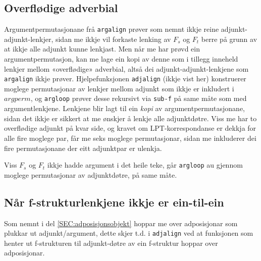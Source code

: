 \documentclass[12pt,a4paper,oneside,draft]{report}
\begin{document}
\subsection{Overflødige adverbial}
\label{sec-4.1.1}

   \label{SEC:impl-adjalign}

Argumentpermutasjonane frå \texttt{argalign} prøver som nemnt ikkje reine
adjunkt-adjunkt-lenkjer, sidan me ikkje vil forkaste lenking av $F_s$
og $F_t$ berre på grunn av at ikkje alle adjunkt kunne lenkjast. Men
når me har prøvd ein argumentpermutasjon, kan me lage ein kopi av
denne som i tillegg inneheld lenkjer mellom «overflødige» adverbial,
altså dei adjunkt-adjunkt-lenkjene som \texttt{argalign} ikkje
prøver. Hjelpefunksjonen \texttt{adjalign} (ikkje vist her) konstruerer
moglege permutasjonar av lenkjer mellom adjunkt som ikkje er inkludert
i $argperm$, og \texttt{argloop} prøver desse rekursivt via \texttt{sub-f} på same
måte som med argumentlenkjene. Lenkjene blir lagt til ein \emph{kopi} av
argumentpermutasjonane, sidan det ikkje er sikkert at me ønskjer å
lenkje alle adjunktdøtre. Viss me har to overflødige adjunkt på kvar
side, og kravet om LPT\hyp{}korrespondanse er dekkja for alle fire moglege
par, får me seks moglege permutasjonar, sidan me inkluderer dei fire
permutasjonane der eitt adjunktpar er ulenkja.

Viss $F_s$ og $F_t$ ikkje hadde argument i det heile teke, går
\texttt{argloop} au gjennom moglege permutasjonar av adjunktdøtre, på same
måte.
\subsection{Når f\hyp{}strukturlenkjene ikkje er ein-til-ein}
\label{sec-4.1.2}

Som nemnt i del \ref{SEC:adposisjonsobjekt} hoppar me over
 adposisjonar som plukkar ut adjunkt/argument, dette skjer t.d. i
 \texttt{adjalign} ved at funksjonen som henter ut f\hyp{}strukturen til
 adjunkt-døtre av ein f\hyp{}struktur hoppar over adposisjonar.
\end{document}
